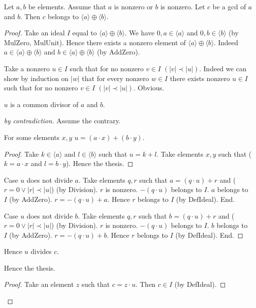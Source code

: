 \documentclass[english]{article}
\begin{document}
  \begin{forthel}
    \begin{theorem}\label{GCDin}
      Let $a,b$ be elements.
      Assume that $a$ is nonzero or $b$ is nonzero.
      Let $c$ be a gcd of $a$ and $b$.
      Then $c$ belongs to $\langle a \rangle \oplus \langle b \rangle$.
    \end{theorem}
    \begin{proof}
      Take an ideal $I$ equal to $\langle a \rangle \oplus \langle b \rangle$.
      We have $0,a \in \langle a \rangle$ and $0,b \in \langle b \rangle$
      (by MulZero, MulUnit).
      Hence there exists a nonzero element of
      $\langle a \rangle \oplus \langle b \rangle$.
      Indeed $a \in \langle a \rangle \oplus \langle b \rangle$ and
      $b \in \langle a \rangle \oplus \langle b \rangle$ (by AddZero).

      Take a nonzero $u \in I$ such that for no nonzero
      $v \in I$ $(|v| \prec |u|)$.
      Indeed we can show by induction on $|w|$ that for every nonzero $w \in I$
      there exists nonzero $u \in I$ such that for no nonzero
      $v \in I$ $(|v| \prec |u|)$.
      Obvious.

      $u$ is a common divisor of $a$ and $b$.
      \begin{proof}[by contradiction]
        Assume the contrary.

        For some elements $x,y$ $u = (a \cdot x) + (b \cdot y)$.
        \begin{proof}
          Take $k \in \langle a \rangle$ and $l \in \langle b \rangle$ such that
          $u = k + l$.
          Take elements $x,y$ such that ($k = a \cdot x$ and $l = b \cdot y$).
          Hence the thesis.
        \end{proof}

        Case $u$ does not divide $a$.
          Take elements $q,r$ such that $a = (q \cdot u) + r$ and
          ($r = 0 \vee |r| \prec |u|$) (by Division).
          $r$ is nonzero.
          $-(q \cdot u)$ belongs to $I$.
          $a$ belongs to $I$ (by AddZero).
          $r = - (q \cdot u) + a$.
          Hence $r$ belongs to $I$ (by DefIdeal).
        End.

        Case $u$ does not divide $b$.
          Take elements $q,r$ such that $b = (q \cdot u) + r$ and
          ($r = 0 \vee |r| \prec |u|$) (by Division).
          $r$ is nonzero.
          $-(q \cdot u)$ belongs to $I$.
          $b$ belongs to $I$ (by AddZero).
          $r = - (q \cdot u) + b$.
          Hence $r$ belongs to $I$ (by DefIdeal).
        End.
      \end{proof}

      Hence $u$ divides $c$.

      Hence the thesis.
      \begin{proof}
        Take an element $z$ such that $c = z \cdot u$.
        Then $c \in I$ (by DefIdeal).
      \end{proof}
    \end{proof}
  \end{forthel}
\end{document}
